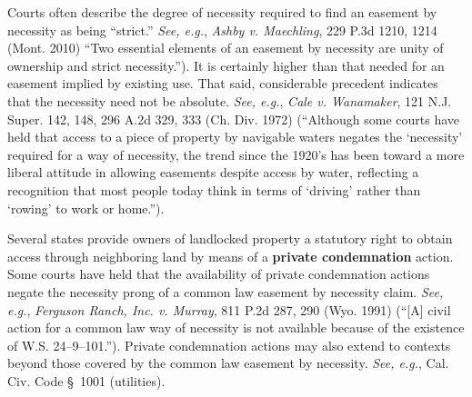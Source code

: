 Courts often describe the degree of necessity required to find an easement by
necessity as being ``strict.'' \textit{See, e.g.}, \emph{Ashby v. Maechling},
229 P.3d 1210, 1214 (Mont. 2010) ``Two essential elements of an easement by
necessity are unity of ownership and strict necessity.''). It is certainly
higher than that needed for an easement implied by existing use. That said,
considerable precedent indicates that the necessity need not be absolute.
\textit{See, e.g.}, \emph{Cale v. Wanamaker}, 121 N.J. Super. 142, 148, 296 A.2d
329, 333 (Ch. Div. 1972) (``Although some courts have held that access to a
piece of property by navigable waters negates the `necessity' required for a way
of necessity, the trend since the 1920's has been toward a more liberal attitude
in allowing easements despite access by water, reflecting a recognition that
most people today think in terms of `driving' rather than `rowing' to work or
home.'').



\item Several states provide owners of landlocked property a statutory right to
obtain access through neighboring land by means of a \textbf{private
condemnation} action. Some courts have held that the availability of private
condemnation actions negate the necessity prong of a common law easement by
necessity claim. \textit{See, e.g.}, \emph{Ferguson Ranch, Inc. v. Murray}, 811
P.2d 287, 290 (Wyo. 1991) (``[A] civil action for a common law way of necessity
is not available because of the existence of W.S. 24--9--101.''). Private
condemnation actions may also extend to contexts beyond those covered by the
common law easement by necessity. \textit{See, e.g.}, Cal. Civ. Code \S~1001
(utilities).

